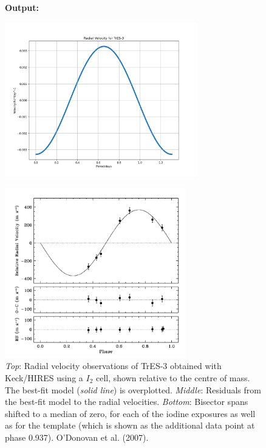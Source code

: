 \documentclass[11pt]{article}
\newcommand*{\figuretitle}[1]{
    	{\textbf{#1}
    	\par\vspace{-1em}}
    }
\begin{document}
\begin{figure}[!hbt]
	\figuretitle{Output:}
	\centering
	\includegraphics[width=0.75\textwidth]{../matplotlib_graphs/radial_velocity_2.png}
\end{figure} 

    
\begin{figure}[!hbt]
	\centering
	\includegraphics[width=0.7\textwidth]{../images/TrE-S_radial_velocity.png}
	\caption{{\it Top}: Radial velocity observations of TrES-3 obtained with Keck/HIRES using a $I_{2}$ cell, shown relative to the centre of mass. The best-fit model ({\it solid line}) is overplotted. {\it Middle}: Residuals from the best-fit model to the radial velocities. {\it Bottom}: Bisector spans shifted to a median of zero, for each of the iodine exposures as well as for the template (which is shown as the additional data point at phase 0.937). O'Donovan et al. (2007).} \label{Figure 4.d}
\end{figure}    
\end{document}
